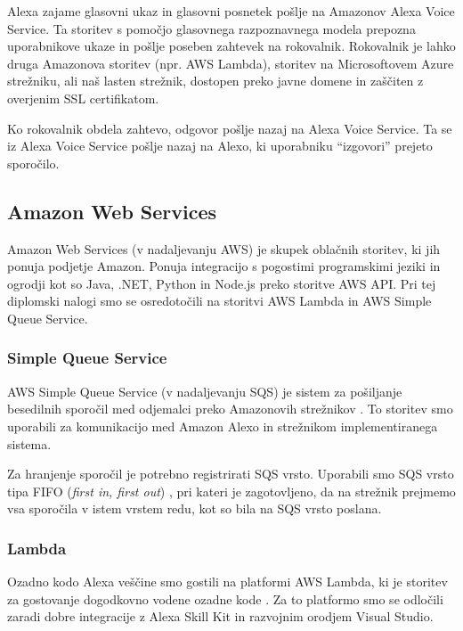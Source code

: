 \documentclass[a4paper, 12pt]{book}
\begin{document}
Alexa zajame glasovni ukaz in glasovni posnetek pošlje na Amazonov Alexa Voice Service.
Ta storitev s pomočjo glasovnega razpoznavnega modela prepozna uporabnikove ukaze in pošlje poseben zahtevek na rokovalnik.
Rokovalnik je lahko druga Amazonova storitev (npr. AWS Lambda), storitev na Microsoftovem Azure strežniku, ali naš lasten strežnik, dostopen preko javne domene in zaščiten z overjenim SSL certifikatom.

Ko rokovalnik obdela zahtevo, odgovor pošlje nazaj na Alexa Voice Service.
Ta se iz Alexa Voice Service pošlje nazaj na Alexo, ki uporabniku \enquote{izgovori} prejeto sporočilo.



\subsection{Amazon Web Services}

Amazon Web Services (v nadaljevanju AWS) je skupek oblačnih storitev, ki jih ponuja podjetje Amazon.
Ponuja integracijo s pogostimi programskimi jeziki in ogrodji kot so Java, .NET, Python in Node.js preko storitve AWS API.
Pri tej diplomski nalogi smo se osredotočili na storitvi AWS Lambda in AWS Simple Queue Service.



\subsubsection{Simple Queue Service}

AWS Simple Queue Service (v nadaljevanju SQS) je sistem za pošiljanje besedilnih sporočil med odjemalci preko Amazonovih strežnikov \cite{sqs}.
To storitev smo uporabili za komunikacijo med Amazon Alexo in strežnikom implementiranega sistema.

Za hranjenje sporočil je potrebno registrirati SQS vrsto. 
Uporabili smo SQS vrsto tipa FIFO (\textit{first in, first out}) \cite{sqsfifo}, pri kateri je zagotovljeno, da na strežnik prejmemo vsa sporočila v istem vrstem redu, kot so bila na SQS vrsto poslana.




\subsubsection{Lambda}

Ozadno kodo Alexa veščine smo gostili na platformi AWS Lambda, ki je storitev za gostovanje dogodkovno vodene ozadne kode \cite{lambda}.
Za to platformo smo se odločili zaradi dobre integracije z Alexa Skill Kit in razvojnim orodjem Visual Studio.
\end{document}
